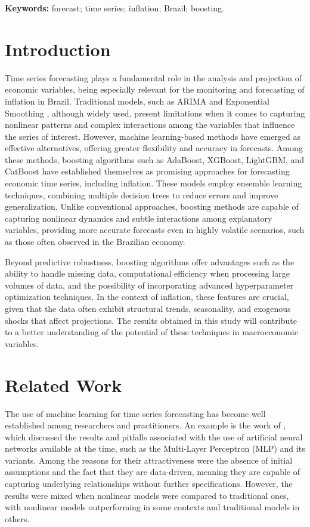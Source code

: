 \vspace{0.5cm}
\textbf{Keywords:} forecast; time series; inflation; Brazil; boosting.

\section{Introduction}

Time series forecasting plays a fundamental role in the analysis and projection of economic variables, being especially relevant for the monitoring and forecasting of inflation in Brazil. Traditional models, such as ARIMA \citep{boxjenkins1970} and Exponential Smoothing \citep{holt1957}, although widely used, present limitations when it comes to capturing nonlinear patterns and complex interactions among the variables that influence the series of interest. However, machine learning-based methods have emerged as effective alternatives, offering greater flexibility and accuracy in forecasts. Among these methods, boosting algorithms such as AdaBoost, XGBoost, LightGBM, and CatBoost have established themselves as promising approaches for forecasting economic time series, including inflation. These models employ ensemble learning techniques, combining multiple decision trees to reduce errors and improve generalization. Unlike conventional approaches, boosting methods are capable of capturing nonlinear dynamics and subtle interactions among explanatory variables, providing more accurate forecasts even in highly volatile scenarios, such as those often observed in the Brazilian economy.

Beyond predictive robustness, boosting algorithms offer advantages such as the ability to handle missing data, computational efficiency when processing large volumes of data, and the possibility of incorporating advanced hyperparameter optimization techniques. In the context of inflation, these features are crucial, given that the data often exhibit structural trends, seasonality, and exogenous shocks that affect projections. The results obtained in this study will contribute to a better understanding of the potential of these techniques in macroeconomic variables.

\section{Related Work}

The use of machine learning for time series forecasting has become well established among researchers and practitioners. An example is the work of \cite{zhang1998forecasting}, which discussed the results and pitfalls associated with the use of artificial neural networks available at the time, such as the Multi-Layer Perceptron (MLP) and its variants. Among the reasons for their attractiveness were the absence of initial assumptions and the fact that they are data-driven, meaning they are capable of capturing underlying relationships without further specifications. However, the results were mixed when nonlinear models were compared to traditional ones, with nonlinear models outperforming in some contexts and traditional models in others.

